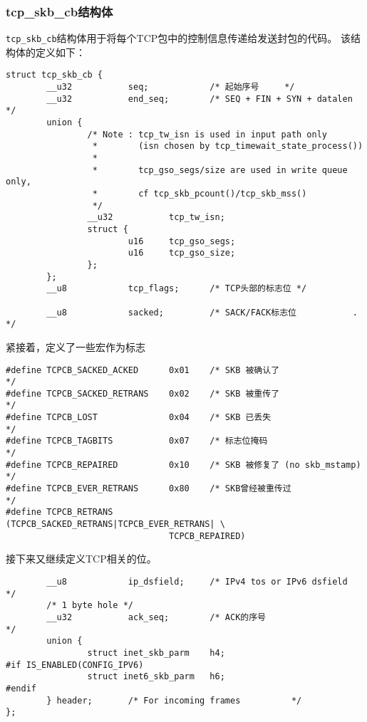 \subsubsection{tcp\_skb\_cb结构体}
\label{subsec:tcp_skb_sb_structure}
\texttt{tcp_skb_cb}结构体用于将每个TCP包中的控制信息传递给发送封包的代码。
该结构体的定义如下：
\begin{verbatim}
struct tcp_skb_cb {
        __u32           seq;            /* 起始序号     */
        __u32           end_seq;        /* SEQ + FIN + SYN + datalen    */
        union {
                /* Note : tcp_tw_isn is used in input path only
                 *        (isn chosen by tcp_timewait_state_process())
                 *
                 *        tcp_gso_segs/size are used in write queue only,
                 *        cf tcp_skb_pcount()/tcp_skb_mss()
                 */
                __u32           tcp_tw_isn;
                struct {
                        u16     tcp_gso_segs;
                        u16     tcp_gso_size;
                };
        };
        __u8            tcp_flags;      /* TCP头部的标志位 */

        __u8            sacked;         /* SACK/FACK标志位           .   */
\end{verbatim}
紧接着，定义了一些宏作为标志
\begin{verbatim}
#define TCPCB_SACKED_ACKED      0x01    /* SKB 被确认了                  */
#define TCPCB_SACKED_RETRANS    0x02    /* SKB 被重传了                  */
#define TCPCB_LOST              0x04    /* SKB 已丢失                    */
#define TCPCB_TAGBITS           0x07    /* 标志位掩码                    */
#define TCPCB_REPAIRED          0x10    /* SKB 被修复了 (no skb_mstamp)  */
#define TCPCB_EVER_RETRANS      0x80    /* SKB曾经被重传过                */
#define TCPCB_RETRANS           (TCPCB_SACKED_RETRANS|TCPCB_EVER_RETRANS| \
                                TCPCB_REPAIRED)
\end{verbatim}
接下来又继续定义TCP相关的位。
\begin{verbatim}
        __u8            ip_dsfield;     /* IPv4 tos or IPv6 dsfield     */
        /* 1 byte hole */
        __u32           ack_seq;        /* ACK的序号                     */
        union {
                struct inet_skb_parm    h4;
#if IS_ENABLED(CONFIG_IPV6)
                struct inet6_skb_parm   h6;
#endif
        } header;       /* For incoming frames          */
};
\end{verbatim}


